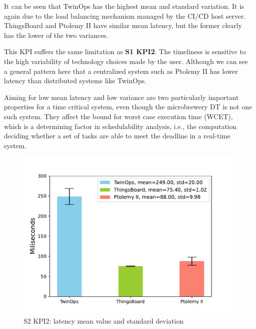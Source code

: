 It can be seen that TwinOps has the highest mean and standard variation. It is again due to the load balancing mechanism managed by the CI/CD host server. ThingsBoard and Ptolemy II have similar mean latency, but the former clearly has the lower of the two variances.

This KPI suffers the same limitation as \textbf{S1 KPI2}. The timeliness is sensitive to the high variability of technology choices made by the user. Although we can see a general pattern here that a centralized system such as Ptolemy II has lower latency than distributed systems like TwinOps.

Aiming for low mean latency and low variance are two particularly important properties for a time critical system, even though the microbrewery DT is not one such system. They affect the bound for worst case execution time (WCET), which is a determining factor in schedulability analysis, i.e., the computation deciding whether a set of tasks are able to meet the deadline in a real-time system.

\begin{figure}[hbt!]
  \centering
  \includegraphics[scale=0.5]{figures/s2kpi2.pdf}
  \caption[S2 KPI2: latency]{S2 KPI2: latency mean value and standard deviation}
  \label{fig:s2kpi2}
\end{figure}

